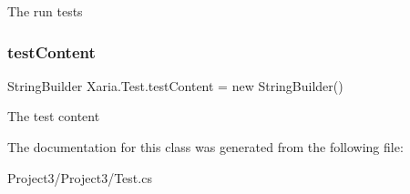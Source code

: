 The run tests 

\mbox{\label{classXaria_1_1Test_afc1b76ea79ceceeb584f3a3a04cd01d3}} 
\subsubsection{\texorpdfstring{test\+Content}{testContent}}
{\footnotesize\ttfamily String\+Builder Xaria.\+Test.\+test\+Content = new String\+Builder()\hspace{0.3cm}{\ttfamily [private]}}



The test content 



The documentation for this class was generated from the following file\+:\begin{DoxyCompactItemize}
\item 
Project3/\+Project3/Test.\+cs\end{DoxyCompactItemize}
